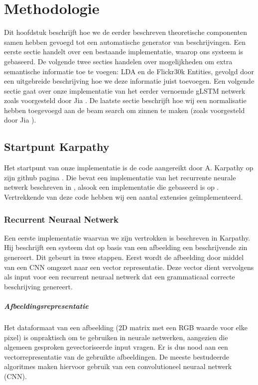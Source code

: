 \chapter{Methodologie}
Dit hoofdstuk beschrijft hoe we de eerder beschreven theoretische componenten samen hebben gevoegd tot een automatische generator van beschrijvingen. Een eerste sectie handelt over een bestaande implementatie, waarop ons systeem is gebaseerd. De volgende twee secties handelen over mogelijkheden om extra semantische informatie toe te voegen: LDA en de Flickr30k Entities, gevolgd door een uitgebreide beschrijving hoe we deze informatie juist toevoegen. Een volgende sectie gaat over onze implementatie van het eerder vernoemde gLSTM netwerk zoals voorgesteld door Jia . De laatste sectie beschrijft hoe wij een normalisatie hebben toegevoegd aan de beam search om zinnen te maken (zoals voorgesteld door Jia ).

\section{Startpunt Karpathy} 
Het startpunt van onze implementatie is de code aangereikt door A. Karpathy op zijn github pagina . Die bevat een implementatie van het recurrente neurale netwerk beschreven in , alsook een implementatie die gebaseerd is op . Vertrekkende van deze code hebben wij een aantal extensies ge\"implementeerd.
\subsection{Recurrent Neuraal Netwerk}
Een eerste implementatie waarvan we zijn vertrokken is beschreven in Karpathy. Hij beschrijft een systeem dat op basis van een afbeelding een beschrijvende zin genereert. Dit gebeurt in twee stappen. Eerst wordt de afbeelding door middel van een CNN omgezet naar een vector representatie. Deze vector dient vervolgens als input voor een recurrent neuraal netwerk dat een grammaticaal correcte beschrijving genereert.

\paragraph{Afbeeldingsrepresentatie}
Het dataformaat van een afbeelding (2D matrix met een RGB waarde voor elke pixel) is onpraktisch om te gebruiken in neurale netwerken, aangezien die algemeen gesproken gevectoriseerde input vragen. Er is dus nood aan een vectorrepresentatie van de gebruikte afbeeldingen. De meeste bestudeerde algoritmes maken hiervoor gebruik van een convolutioneel neuraal netwerk (CNN).

